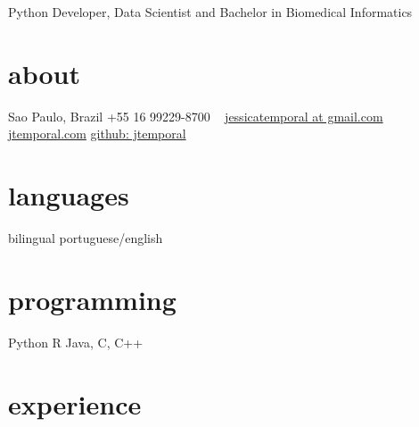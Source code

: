 \documentclass[]{friggeri-cv}
\begin{document}
       {Python Developer, Data Scientist and Bachelor in Biomedical Informatics}


\begin{aside}
  \section{about}
    Sao Paulo, Brazil
    +55 16 99229-8700
    ~
    \href{mailto:jessicatemporal@gmail.com}{jessicatemporal at gmail.com}
    \href{http://jtemporal.com}{jtemporal.com}
    \href{http://github.com/jtemporal/}{github: jtemporal}
  \section{languages}
    bilingual portuguese/english
  \section{programming}
    Python
    R
    Java, C, C++
\end{aside}

\section{experience}
\end{document}
